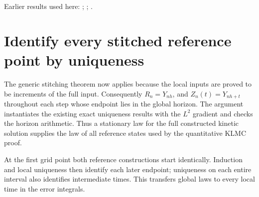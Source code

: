 \documentclass[11pt,a4paper]{article}
\begin{document}
Earlier results used here: \cite[Section~3.13.2]{LangevinLean2026ULASC}; \cite[Section~3.13.5]{LangevinLean2026ULASC}; \cite[Section~3.17.1]{LangevinLean2026ULASC}.

\section{\texorpdfstring{Identify every stitched reference point by uniqueness}{Identify every stitched reference point by uniqueness}}


The generic stitching theorem now applies because the local inputs are proved to be increments of the full input. Consequently \(R_n=Y_{nh}\), and \(Z_n(t)=Y_{nh+t}\) throughout each step whose endpoint lies in the global horizon. The argument instantiates the existing exact uniqueness results with the \(L^{2}\) gradient and checks the horizon arithmetic. Thus a stationary law for the full constructed kinetic solution supplies the law of all reference states used by the quantitative KLMC proof.



At the first grid point both reference constructions start identically. Induction and local uniqueness then identify each later endpoint; uniqueness on each entire interval also identifies intermediate times. This transfers global laws to every local time in the error integrals.
\end{document}
